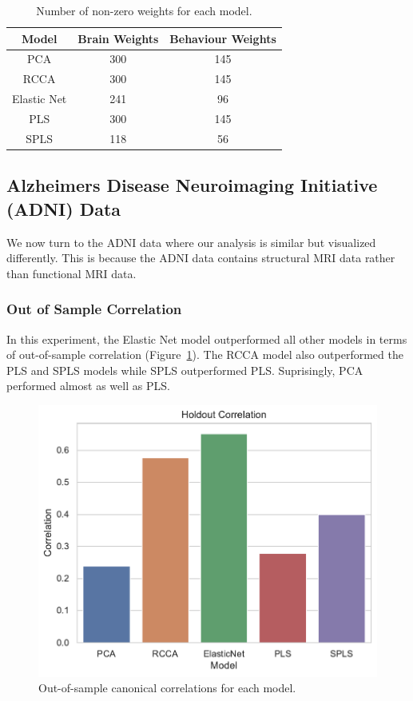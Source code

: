 \begin{table}[h]
\centering
\caption{Number of non-zero weights for each model.}
\begin{tabular}{|c|c|c|}
\hline
Model &  Brain Weights &  Behaviour Weights \\
\hline
PCA & 300 & 145 \\
RCCA & 300 & 145 \\
Elastic Net & 241 & 96 \\
PLS & 300 & 145 \\
SPLS & 118 & 56 \\
\hline
\end{tabular}\label{tab:brain-behaviour-weights-hcp}
\end{table}

\newpage
\subsection{Alzheimers Disease Neuroimaging Initiative (ADNI) Data}\label{subsec:adni}

We now turn to the ADNI data where our analysis is similar but visualized differently.
This is because the ADNI data contains structural MRI data rather than functional MRI data.

\subsubsection{Out of Sample Correlation}

In this experiment, the Elastic Net model outperformed all other models in terms of out-of-sample correlation (Figure~\ref{fig:performance}).
The RCCA model also outperformed the PLS and SPLS models while SPLS outperformed PLS.
Suprisingly, PCA performed almost as well as PLS.

\begin{figure}
\centering
\includegraphics[width=0.5\linewidth]{figures/adni/holdout_correlations}
\caption{Out-of-sample canonical correlations for each model.}\label{fig:performance}
\end{figure}

